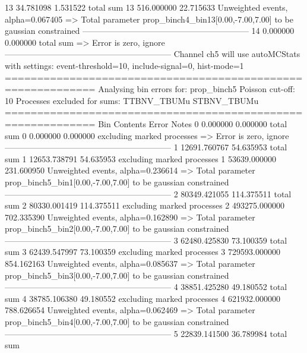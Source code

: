 13         34.781098       1.531522        total sum                     
13         516.000000      22.715633       Unweighted events, alpha=0.067405
  => Total parameter prop_binch4_bin13[0.00,-7.00,7.00] to be gaussian constrained
------------------------------------------------------------
14         0.000000        0.000000        total sum                     
  => Error is zero, ignore      
------------------------------------------------------------
Channel ch5 will use autoMCStats with settings: event-threshold=10, include-signal=0, hist-mode=1
============================================================
Analysing bin errors for: prop_binch5
Poisson cut-off: 10
Processes excluded for sums: TTBNV_TBUMu STBNV_TBUMu
============================================================
Bin        Contents        Error           Notes                         
0          0.000000        0.000000        total sum                     
0          0.000000        0.000000        excluding marked processes    
  => Error is zero, ignore      
------------------------------------------------------------
1          12691.760767    54.635953       total sum                     
1          12653.738791    54.635953       excluding marked processes    
1          53639.000000    231.600950      Unweighted events, alpha=0.236614
  => Total parameter prop_binch5_bin1[0.00,-7.00,7.00] to be gaussian constrained
------------------------------------------------------------
2          80349.421055    114.375511      total sum                     
2          80330.001419    114.375511      excluding marked processes    
2          493275.000000   702.335390      Unweighted events, alpha=0.162890
  => Total parameter prop_binch5_bin2[0.00,-7.00,7.00] to be gaussian constrained
------------------------------------------------------------
3          62480.425830    73.100359       total sum                     
3          62439.547997    73.100359       excluding marked processes    
3          729593.000000   854.162163      Unweighted events, alpha=0.085637
  => Total parameter prop_binch5_bin3[0.00,-7.00,7.00] to be gaussian constrained
------------------------------------------------------------
4          38851.425280    49.180552       total sum                     
4          38785.106380    49.180552       excluding marked processes    
4          621932.000000   788.626654      Unweighted events, alpha=0.062469
  => Total parameter prop_binch5_bin4[0.00,-7.00,7.00] to be gaussian constrained
------------------------------------------------------------
5          22839.141500    36.789984       total sum                     
